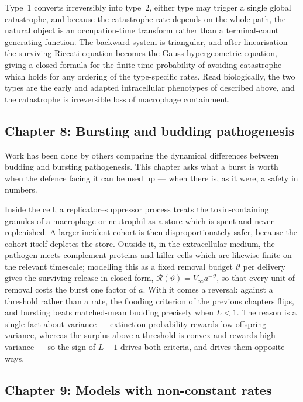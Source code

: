Type~1 converts irreversibly into type~2, either type may trigger a single
global catastrophe, and because the catastrophe rate depends on the whole path,
the natural object is an occupation-time transform rather than a
terminal-count generating function. The backward system is triangular, and
after linearisation the surviving Riccati equation becomes the Gauss
hypergeometric equation, giving a closed formula for the finite-time
probability of avoiding catastrophe which holds for any ordering of the
type-specific rates. Read biologically, the two types are the early and adapted
intracellular phenotypes of \yp{} described above, and the catastrophe is
irreversible loss of macrophage containment.

\subsection*{Chapter 8: Bursting and budding pathogenesis}

Work has been done by others
\cite{komarova2007viral,yuan2011stochastic,pearson2011stochastic,capistran2018extracellular}
comparing the dynamical differences between budding and bursting pathogenesis.
This chapter asks what a burst is worth when the defence facing it can be used
up --- when there is, as it were, a safety in numbers.

Inside the cell, a replicator--suppressor process treats the toxin-containing
granules of a macrophage or neutrophil as a store which is spent and never
replenished. A larger incident cohort is then disproportionately safer, because
the cohort itself depletes the store. Outside it, in the extracellular medium,
the pathogen meets complement proteins and killer cells which are likewise
finite on the relevant timescale; modelling this as a fixed removal budget
$\vartheta$ per delivery gives the surviving release in closed form,
$\mathcal{R}(\vartheta)=V_\infty a^{-\vartheta}$, so that every unit of removal
costs the burst one factor of $a$. With it comes a reversal: against a
threshold rather than a rate, the flooding criterion of the previous chapters
flips, and bursting beats matched-mean budding precisely when $L<1$. The reason
is a single fact about variance --- extinction probability rewards low
offspring variance, whereas the surplus above a threshold is convex and rewards
high variance --- so the sign of $L-1$ drives both criteria, and drives them
opposite ways.

\subsection*{Chapter 9: Models with non-constant rates}

